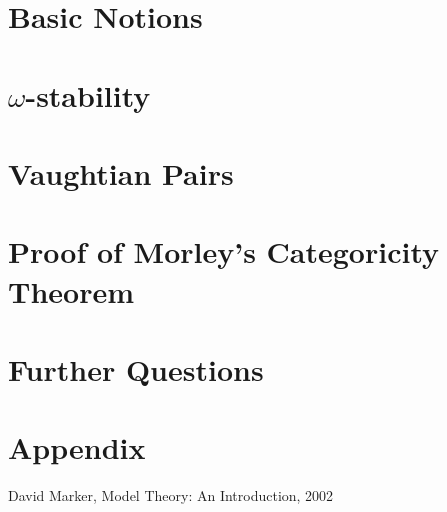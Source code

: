 \documentclass[12pt]{article}
\theoremstyle{definition}
\theoremstyle{definition}
\theoremstyle{plain}
\theoremstyle{remark}
\numberwithin{equation}{section}
\begin{document}

%

\pagestyle{myheadings} \markright{}

\section{Basic Notions}


\section{\(\omega\)-stability}


\section{Vaughtian Pairs}


\section{Proof of Morley's Categoricity Theorem}


\section{Further Questions}


\appendix
\section{Appendix}


\begin{thebibliography} \small
%
 David Marker, Model Theory: An Introduction, 2002
%
\end{thebibliography}
\end{document}

